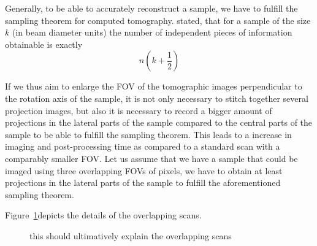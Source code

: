 Generally, to be able to accurately reconstruct a sample, we have to fulfill the sampling theorem for computed tomography. \citet{Cormack1978} stated, that for a sample of the size $k$ (in beam diameter units) the number of independent pieces of information obtainable is exactly
\begin{equation}
n(k+\frac{1}{2})%
\end{equation}


If we thus aim to enlarge the FOV of the tomographic images perpendicular to the rotation axis of the sample, it is not only necessary to stitch together several projection images, but also it is necessary to record a bigger amount of projections in the lateral parts of the sample compared to the central parts of the sample to be able to fulfill the sampling theorem. This leads to a increase in imaging and post-processing time as compared to a standard scan with a comparably smaller FOV. Let us assume that we have a sample that could be imaged using three overlapping FOVs of \unit{}{pixels}, we have to obtain at least \unit{}{projections} in the lateral parts of the sample to fulfill the aforementioned sampling theorem.

Figure~\ref{fig:overlapping scans}depicts the details of the overlapping scans.

\newcommand{\nvar}[2]{%
    \newlength{#1}
    \setlength{#1}{#2}
}

\nvar{\e}{0.79cm}	

\begin{figure}[tb] %
	\centering
	\caption{this should ultimatively explain the overlapping scans}
	\label{fig:overlapping scans}
\end{figure}

